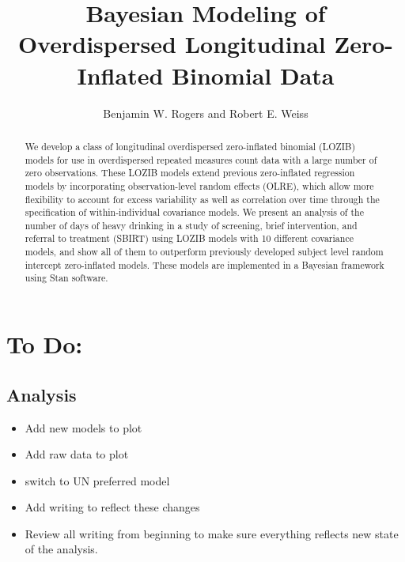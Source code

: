 \documentclass[12pt]{article}
\title{Bayesian Modeling of Overdispersed Longitudinal Zero-Inflated Binomial Data}
\author{Benjamin W. Rogers and Robert E. Weiss}
\begin{document}
\newcommand{\del}[2]{\frac{\partial {#1} }{\partial {#2}} }
\newcommand{\dby}[2]{\frac{d {#1} }{d {#2}} }
\newcommand{\sbar}{\overline{s}}
\newtheorem{proposition}{Proposition}

\theoremstyle{remark}
\newtheorem*{remark}{Remark}

\maketitle

\begin{abstract}
 We develop a class of longitudinal overdispersed zero-inflated binomial (LOZIB) models for use in overdispersed repeated measures count data with a large number of zero observations. These LOZIB models extend previous zero-inflated regression models by incorporating observation-level random effects (OLRE), which allow more flexibility to account for excess variability as well as correlation over time through the specification of within-individual covariance models. We present an analysis of the number of days of heavy drinking in a study of screening, brief intervention, and referral to treatment (SBIRT) using LOZIB models with 10 different covariance models, and show all of them to outperform previously developed subject level random intercept zero-inflated models. These models are implemented in a Bayesian framework using Stan software.
\end{abstract}

\section{To Do:}

\subsection{Analysis}
\begin{itemize}
	\item Add new models to plot
	\item Add raw data to plot
	\item switch to UN preferred model
	\item Add writing to reflect these changes
	\item Review all writing from beginning to make sure everything reflects new state of the analysis.
	
\end{itemize}
\end{document}
